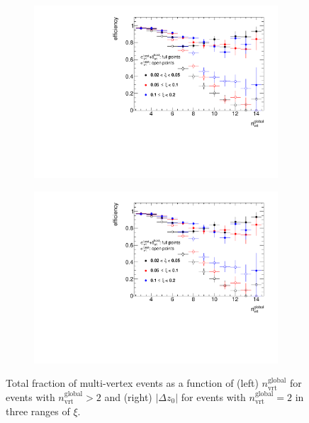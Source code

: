 
\begin{figure}[t!]
	\centering
	\begin{subfigure}{.49\textwidth}
		\includegraphics[width=\textwidth,page=2]{chapters/chrgSTAR/img/vertex/vertexEffi_ksi.pdf}
	\end{subfigure}
	\begin{subfigure}{.49\textwidth}
		\includegraphics[width=\textwidth,page=9]{chapters/chrgSTAR/img/vertex/vertexEffi_ksi.pdf}
	\end{subfigure}
	\caption{Total fraction of multi-vertex events as a function of (left) $n_\textrm{vrt}^\textrm{global}$ for events with $n^\textrm{global}_\textrm{vrt}>2$ and (right) $|\Delta z_0|$ for events with $n^\textrm{global}_\textrm{vrt}=2$  in three ranges of $\xi$.}
	\label{fig:vertexVetoDZ}
	\vspace{0.5cm}
	

\end{figure}
